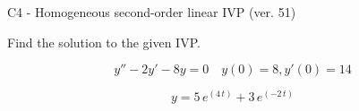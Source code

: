 \begin{exercise}
  \begin{exerciseTitle}C4 - Homogeneous second-order linear IVP (ver. 51)\end{exerciseTitle}
  \begin{exerciseStatement}
    
Find the solution to the given IVP.

    
\[y''-2y'-8y = 0 \hspace{1em} y(0) = 8 , y'(0) = 14\]

  \end{exerciseStatement}
  \begin{exerciseAnswer}
    
\[y= 5 \, e^{\left(4 \, t\right)} + 3 \, e^{\left(-2 \, t\right)}\]

  \end{exerciseAnswer}
\end{exercise}